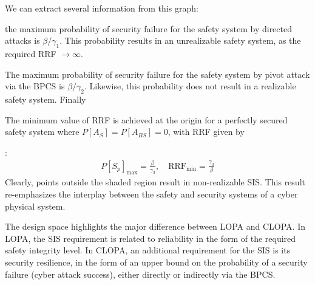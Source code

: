 \documentclass[journal]{IEEEtran}
\begin{document}
We can extract several information from this graph: \begin{inparaenum} [(1)]\item the maximum probability of security failure for the safety system by directed attacks is $\beta/\gamma_1$. This probability results in an unrealizable safety system, as the required RRF $\rightarrow \infty$. \item The maximum probability of security failure for the safety system by pivot attack via the BPCS is $\beta/\gamma_2$. Likewise, this probability does not result in a realizable safety system. Finally \item The minimum value of RRF is achieved at the origin for a perfectly secured safety system where $P[A_S] = P[A_{BS}] = 0$, with RRF given by \end{inparaenum}:
\begin{align}
P[S_p]_{\max} = \frac{\beta}{\gamma_3}, \quad \text{RRF}_{\min}= \frac{\gamma_3}{\beta}
\end{align}
Clearly, points outside the shaded region result in non-realizable SIS. This result re-emphasizes the interplay between the safety and security systems of a cyber physical system.

The design space highlights the major difference between LOPA and CLOPA. In LOPA, the SIS requirement is related to reliability in the form of the required safety integrity level. In CLOPA, an additional requirement for the SIS is its security resilience, in the form of an upper bound on the probability of a security failure (cyber attack success), either directly or indirectly via the BPCS.
\end{document}
